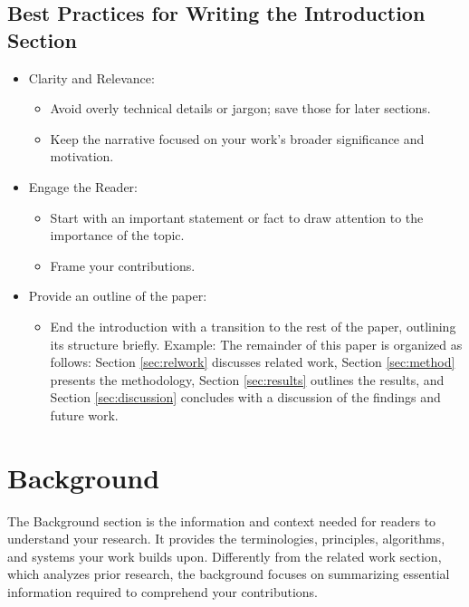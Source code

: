 \documentclass[conference]{IEEEtran}
\begin{document}
\subsection{Best Practices for Writing the Introduction Section}
\begin{itemize}
\item  Clarity and Relevance:  
\begin{itemize}
  \item Avoid overly technical details or jargon; save those for later sections.  
  \item Keep the narrative focused on your work's broader significance and motivation.  
\end{itemize}

\item Engage the Reader:  
\begin{itemize}
  \item Start with an important statement or fact to draw attention to the importance of the topic.  
  \item Frame your contributions.
\end{itemize}

\item  Provide an outline of the paper:  
\begin{itemize}
  \item End the introduction with a transition to the rest of the paper, outlining its structure briefly. Example: The remainder of this paper is organized as follows: Section \ref{sec:relwork} discusses related work, Section \ref{sec:method} presents the methodology, Section \ref{sec:results} outlines the results, and Section \ref{sec:discussion} concludes with a discussion of the findings and future work.  
\end{itemize}
\end{itemize}
\section{Background}\label{sec:background}
The Background section is the information and context needed for readers to understand your research. It provides the terminologies, principles, algorithms, and systems your work builds upon. Differently from the related work section, which analyzes prior research, the background focuses on summarizing essential information required to comprehend your contributions.  
\end{document}
